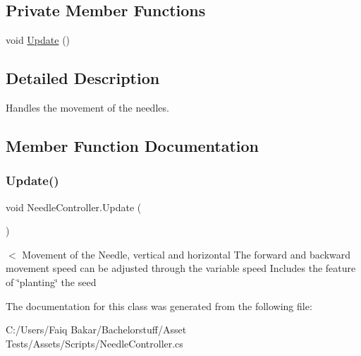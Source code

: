 \subsection*{Private Member Functions}
\begin{DoxyCompactItemize}
\item 
void \mbox{\hyperlink{class_needle_controller_a273d374ac8d5504706fc431af48b91cc}{Update}} ()
\end{DoxyCompactItemize}


\subsection{Detailed Description}
Handles the movement of the needles. 

\subsection{Member Function Documentation}
\mbox{\label{class_needle_controller_a273d374ac8d5504706fc431af48b91cc}} 
\subsubsection{\texorpdfstring{Update()}{Update()}}
{\footnotesize\ttfamily void Needle\+Controller.\+Update (\begin{DoxyParamCaption}{ }\end{DoxyParamCaption})\hspace{0.3cm}{\ttfamily [private]}}

$<$ Movement of the Needle, vertical and horizontal The forward and backward movement speed can be adjusted through the variable \textquotesingle{}speed\textquotesingle{} Includes the feature of \char`\"{}planting\char`\"{} the seed 

The documentation for this class was generated from the following file\+:\begin{DoxyCompactItemize}
\item 
C\+:/\+Users/\+Faiq Bakar/\+Bachelorstuff/\+Asset Tests/\+Assets/\+Scripts/Needle\+Controller.\+cs\end{DoxyCompactItemize}
